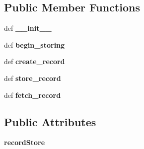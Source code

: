 \subsection*{Public Member Functions}
\begin{DoxyCompactItemize}
\item 
\hypertarget{classcheshire3_1_1record_store_1_1_remote_slave_record_store_aaa4763158fb0fa5228066833afde9161}{def {\bfseries \-\_\-\-\_\-init\-\_\-\-\_\-}}\label{classcheshire3_1_1record_store_1_1_remote_slave_record_store_aaa4763158fb0fa5228066833afde9161}

\item 
\hypertarget{classcheshire3_1_1record_store_1_1_remote_slave_record_store_a9624253f11b7520e9db0de3fdc160950}{def {\bfseries begin\-\_\-storing}}\label{classcheshire3_1_1record_store_1_1_remote_slave_record_store_a9624253f11b7520e9db0de3fdc160950}

\item 
\hypertarget{classcheshire3_1_1record_store_1_1_remote_slave_record_store_a00889e2736575b1e589dcfe77782d85e}{def {\bfseries create\-\_\-record}}\label{classcheshire3_1_1record_store_1_1_remote_slave_record_store_a00889e2736575b1e589dcfe77782d85e}

\item 
\hypertarget{classcheshire3_1_1record_store_1_1_remote_slave_record_store_a70e48cbfb64db6dd584223a1437811a4}{def {\bfseries store\-\_\-record}}\label{classcheshire3_1_1record_store_1_1_remote_slave_record_store_a70e48cbfb64db6dd584223a1437811a4}

\item 
\hypertarget{classcheshire3_1_1record_store_1_1_remote_slave_record_store_a14a4423adb409b5d77b67c0720dcc9df}{def {\bfseries fetch\-\_\-record}}\label{classcheshire3_1_1record_store_1_1_remote_slave_record_store_a14a4423adb409b5d77b67c0720dcc9df}

\end{DoxyCompactItemize}
\subsection*{Public Attributes}
\begin{DoxyCompactItemize}
\item 
\hypertarget{classcheshire3_1_1record_store_1_1_remote_slave_record_store_ad25881bfafc95a1cec81b3a72a949870}{{\bfseries record\-Store}}\label{classcheshire3_1_1record_store_1_1_remote_slave_record_store_ad25881bfafc95a1cec81b3a72a949870}

\end{DoxyCompactItemize}

